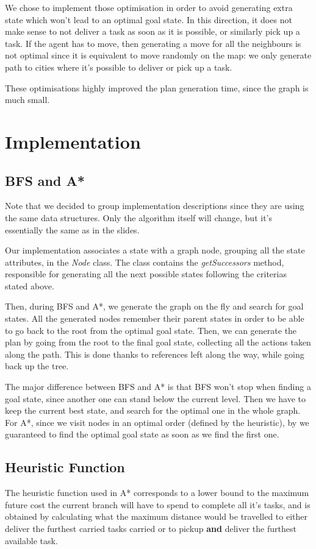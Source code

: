 \documentclass[11pt]{article}
\begin{document}
We chose to implement those optimisation in order to avoid generating extra state which won't lead to an optimal goal state. In this direction, it does not make sense to not deliver a task as soon as it is possible, or similarly pick up a task. If the agent has to move, then generating a move for all the neighbours is not optimal since it is equivalent to move randomly on the map: we only generate path to cities where it's possible to deliver or pick up a task.

These optimisations highly improved the plan generation time, since the graph is much small. 

\section{Implementation}

\subsection{BFS and A*}
Note that we decided to group implementation descriptions since they are using the same data structures. Only the algorithm itself will change, but it's essentially the same as in the slides. 

Our implementation associates a state with a graph node, grouping all the state attributes, in the \textit{Node} class. The class contains the \textit{getSuccessors} method, responsible for generating all the next possible states following the criterias stated above. 

Then, during BFS and A*, we generate the graph on the fly and search for goal states. All the generated nodes remember their parent states in order to be able to go back to the root from the optimal goal state. Then, we can generate the plan by going from the root to the final goal state, collecting all the actions taken along the path. This is done thanks to references left along the way, while going back up the tree. 

The major difference between BFS and A* is that BFS won't stop when finding a goal state, since another one can stand below the current level. Then we have to keep the current best state, and search for the optimal one in the whole graph. For A*, since we visit nodes in an optimal order (defined by the heuristic), by we guaranteed to find the optimal goal state as soon as we find the first one. 

\subsection{Heuristic Function}
The heuristic function used in A* corresponds to a lower bound to the maximum future cost the current branch will have to spend to complete all it's tasks, and is obtained by calculating what the maximum distance would be travelled to either deliver the furthest carried tasks carried or to pickup \textbf{and} deliver the furthest available task.
\end{document}
